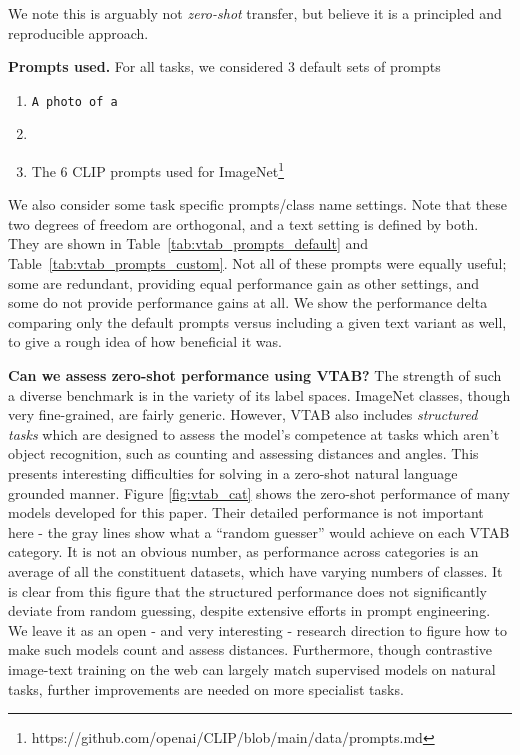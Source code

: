 We note this is arguably not \textit{zero-shot} transfer, but believe it is a principled and reproducible approach.

\textbf{Prompts used.}
For all tasks, we considered 3 default sets of prompts
\begin{enumerate}
\item \texttt{A photo of a \cls}
\item \texttt{\cls}
\item The 6 CLIP prompts used for ImageNet\footnote{https://github.com/openai/CLIP/blob/main/data/prompts.md}
\end{enumerate}

We also consider some task specific prompts/class name settings. Note that these two degrees of freedom are orthogonal, and a text setting is defined by both. They are shown in  Table~\ref{tab:vtab_prompts_default} and Table~\ref{tab:vtab_prompts_custom}. Not all of these prompts were equally useful; some are redundant, providing equal performance gain as other settings, and some do not provide performance gains at all. We show the performance delta comparing only the default prompts versus including a given text variant as well, to give a rough idea of how beneficial it was.


\textbf{Can we assess zero-shot performance using VTAB?}
The strength of such a diverse benchmark is in the variety of its label spaces. ImageNet classes, though very fine-grained, are fairly generic. However, VTAB also includes \textit{structured tasks} which are designed to assess the model's competence at tasks which aren't object recognition, such as counting and assessing distances and angles.
This presents interesting difficulties for solving in a zero-shot natural language grounded manner. Figure \ref{fig:vtab_cat} shows the zero-shot performance of many models developed for this paper. Their detailed performance is not important here - the gray lines show what a “random guesser” would achieve on each VTAB category. It is not an obvious number, as performance across categories is an average of all the constituent datasets, which have varying numbers of classes.
It is clear from this figure that the structured performance does not significantly deviate from random guessing, despite extensive efforts in prompt engineering. We leave it as an open - and very interesting - research direction to figure how to make such models count and assess distances. Furthermore, though contrastive image-text training on the web can largely match supervised models on natural tasks, further improvements are needed on more specialist tasks.

